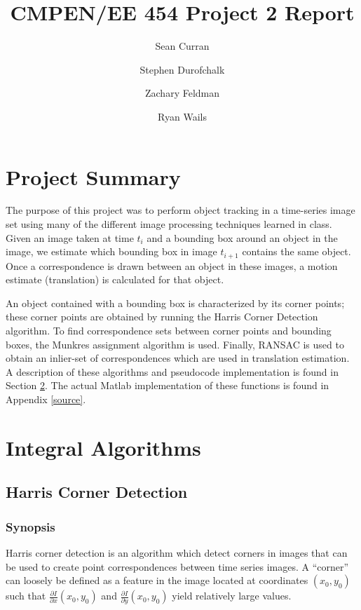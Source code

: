 \documentclass{article}
\author{Sean Curran \\
\and Stephen Durofchalk \\
\and Zachary Feldman \\
\and Ryan Wails}
\title{CMPEN/EE 454 Project 2 Report}
\begin{document}
\maketitle
\thispagestyle{empty}

\newpage
{}
\setcounter{page}{1}
\setcounter{tocdepth}{2}
\tableofcontents
\thispagestyle{plain}

\newpage
{}
\setcounter{page}{1}
\section{Project Summary}
The purpose of this project was to perform object tracking in a time-series image set using many of the different image processing techniques learned in class.  Given an image taken at time $t_i$ and a bounding box around an object in the image, we estimate which bounding box in image $t_{i + 1}$ contains the same object.  Once a correspondence is drawn between an object in these images, a motion estimate (translation) is calculated for that object.

An object contained with a bounding box is characterized by its corner points; these corner points are obtained by running the Harris Corner Detection algorithm.  To find correspondence sets between corner points and bounding boxes, the Munkres assignment algorithm is used.  Finally, RANSAC is used to obtain an inlier-set of correspondences which are used in translation estimation.  A description of these algorithms and pseudocode implementation is found in Section \ref{algo}.  The actual Matlab implementation of these functions is found in Appendix \ref{source}.

\newpage
\section{Integral Algorithms}\label{algo}
\subsection{Harris Corner Detection}
\subsubsection{Synopsis}
Harris corner detection is an algorithm which detect corners in images that can be used to create point correspondences between time series images.  A ``corner'' can loosely be defined as a feature in the image located at coordinates $(x_0,y_0)$ such that $\frac{\partial I}{\partial x}(x_0,y_0)$ and $\frac{\partial I}{\partial y}(x_0,y_0)$ yield relatively large values.
\end{document}
